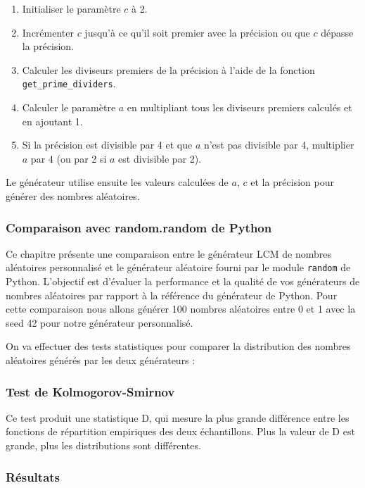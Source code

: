 \documentclass{article}
\begin{document}
\begin{enumerate}
    \item Initialiser le paramètre \(c\) à 2.
    \item  Incrémenter \(c\) jusqu'à ce qu'il soit premier avec la précision ou que \(c\) dépasse la précision.
    \item Calculer les diviseurs premiers de la précision à l'aide de la fonction \texttt{get\_prime\_dividers}.
    \item Calculer le paramètre \(a\) en multipliant tous les diviseurs premiers calculés et en ajoutant 1.
    \item Si la précision est divisible par 4 et que \(a\) n'est pas divisible par 4, multiplier \(a\) par 4 (ou par 2 si \(a\) est divisible par 2).
\end{enumerate}

Le générateur utilise ensuite les valeurs calculées de \(a\), \(c\) et la précision pour générer des nombres aléatoires.

\subsubsection{Comparaison avec random.random de Python}

Ce chapitre présente une comparaison entre le générateur LCM de nombres aléatoires personnalisé et le générateur aléatoire fourni par le module \texttt{random} de Python. L'objectif est d'évaluer la performance et la qualité de vos générateurs de nombres aléatoires par rapport à la référence du générateur de Python.
Pour cette comparaison nous allons générer 100 nombres aléatoires entre 0 et 1 avec la seed 42 pour notre générateur personnalisé.

On va effectuer des tests statistiques pour comparer la distribution des nombres aléatoires générés par les deux générateurs :
\subsubsection*{Test de Kolmogorov-Smirnov}

Ce test produit une statistique D, qui mesure la plus grande différence entre les fonctions de répartition empiriques des deux échantillons. Plus la valeur de D est grande, plus les distributions sont différentes.

\subsubsection*{Résultats}
\end{document}
